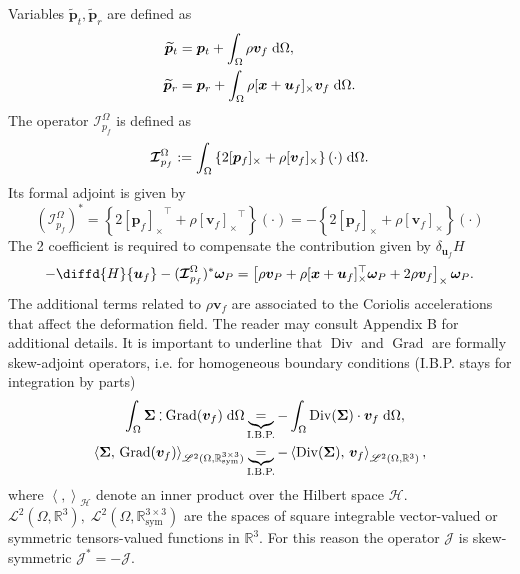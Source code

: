 \documentclass{svjour3}                     %
\DeclareMathOperator*{\Grad}{Grad}
\DeclareMathOperator*{\Div}{Div}
\newcommand{\crmat}[1]{\ensuremath{[#1]_{\times}}}
\def\onedot{$\mathsurround0pt\ldotp$}
\def\cddot{%
	\mathbin{\vcenter{\baselineskip.67ex
			\hbox{\onedot}\hbox{\onedot}}%
}}
\begin{document}
Variables $\widetilde{\bm{p}}_t, \widetilde{\bm{p}}_r$ are defined as
\begin{equation}
\label{eq:mod_momenta}
\begin{aligned}
\widetilde{\bm{p}}_t &= \bm{p}_t + \int_{\Omega} \rho \bm{v}_f \d{\Omega}, \\
\widetilde{\bm{p}}_r &= \bm{p}_r + \int_{\Omega} \rho \crmat{\bm{x} + \bm{u}_f}\bm{v}_f \d{\Omega}. \\
\end{aligned}
\end{equation}
The operator $\bm{\mathcal{I}}_{p_f}^\Omega$ is defined as 
\begin{equation}
\label{eq:mod_momentafl}
\bm{\mathcal{I}}_{p_f}^\Omega := \int_\Omega \left\{2 \crmat{\bm{p}_f} + \rho \crmat{\bm{v}_f} \right\}(\cdot) \d{\Omega}.
\end{equation}
Its  formal adjoint is given by
\begin{equation*}
(\bm{\mathcal{I}}_{p_f}^\Omega)^* = \left\{2 \crmat{\bm{p}_f}^\top + \rho \crmat{\bm{v}_f}^\top \right\}(\cdot) = - \left\{2 \crmat{\bm{p}_f} + \rho \crmat{\bm{v}_f} \right\}(\cdot)
\end{equation*} 
The 2 coefficient is required to compensate the contribution given by $\delta_{\bm{u}_f} H$ 
\[
-\diffd{H}{\bm{u}_f} - (\bm{\mathcal{I}}_{p_f}^\Omega)^* \bm{\omega}_P = \left[\rho \bm{v}_P + \rho \crmat{\bm{x}+\bm{u}_f}^\top \bm\omega_P + 2 \rho \bm{v}_f \right]_\times \bm\omega_P.
\]
The additional terms related to $\rho \bm{v}_f$ are associated to the Coriolis accelerations that affect the deformation field. The reader may consult Appendix B for additional details. It is important to underline that $\Div$ and $\Grad$ are formally skew-adjoint operators, i.e. for homogeneous boundary conditions (I.B.P. stays for integration by parts)
\begin{align*}
\int_{\Omega} \bm\Sigma \cddot \Grad(\bm{v}_f) \d{\Omega} &\underbrace{=}_{\text{I.B.P.}} -\int_{\Omega} \Div(\bm\Sigma) \cdot \bm{v}_f \d{\Omega}, \\
\left\langle \bm\Sigma, \, \Grad(\bm{v}_f) \right\rangle_{\mathscr{L}^2(\Omega, \mathbb{R}^{3\times 3}_{\text{sym}})} &\underbrace{=}_{\text{I.B.P.}} -\left\langle\Div(\bm\Sigma), \, \bm{v}_f \right\rangle_{\mathscr{L}^2(\Omega, \mathbb{R}^3)}, 
\end{align*}
where $\left\langle ,  \right\rangle_\mathscr{H}$ denote an inner product over the Hilbert space $\mathscr{H}$. \\
$\mathscr{L}^2(\Omega, \mathbb{R}^3), \; \mathscr{L}^2(\Omega, \mathbb{R}^{3\times 3}_{\text{sym}})$ are the spaces of square integrable vector-valued or symmetric tensors-valued functions in $\mathbb{R}^3$. For this reason the operator $\bm{\mathcal{J}}$ is skew-symmetric  $\bm{\mathcal{J}}_{}^*=-\bm{\mathcal{J}}$.
\end{document}
